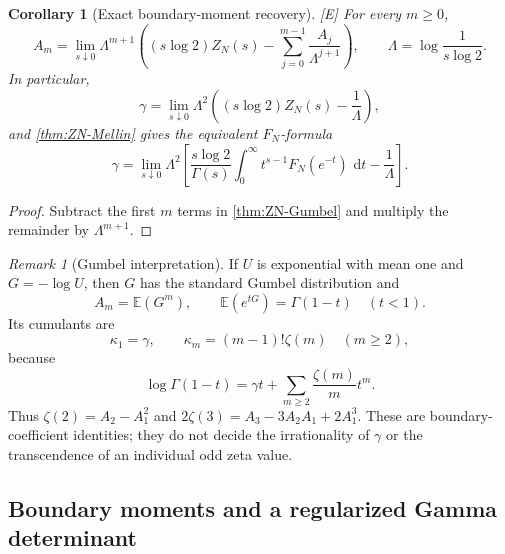 \documentclass[11pt]{article}
\newtheorem{corollary}[theorem]{Corollary}
\theoremstyle{definition}
\theoremstyle{remark}
\newtheorem{remark}[theorem]{Remark}
\newcommand{\status}[1]{\textnormal{\textcolor{accent}{\footnotesize[#1]}}}
\newcommand{\dd}{\,\mathrm d}
\begin{document}
\begin{corollary}[Exact boundary-moment recovery]
\label{cor:ZN-moment-recovery}
\status{E}
For every $m\ge0$,
\begin{equation}\label{eq:ZN-moment-recovery}
 A_m=\lim_{s\downarrow0}\Lambda^{m+1}
 \left((s\log2)Z_N(s)-\sum_{j=0}^{m-1}\frac{A_j}{\Lambda^{j+1}}\right),
 \qquad \Lambda=\log\frac1{s\log2}.
\end{equation}
In particular,
\begin{equation}\label{eq:ZN-gamma-recovery}
 \gamma=\lim_{s\downarrow0}\Lambda^2
 \left((s\log2)Z_N(s)-\frac1\Lambda\right),
\end{equation}
and \cref{thm:ZN-Mellin} gives the equivalent $F_N$-formula
\begin{equation}\label{eq:FN-gamma-recovery}
 \gamma=\lim_{s\downarrow0}\Lambda^2\left[
 \frac{s\log2}{\Gamma(s)}\int_0^\infty t^{s-1}F_N(e^{-t})\,\dd t
 -\frac1\Lambda\right].
\end{equation}
\end{corollary}

\begin{proof}
Subtract the first $m$ terms in \cref{thm:ZN-Gumbel} and multiply the remainder by
$\Lambda^{m+1}$.
\end{proof}

\begin{remark}[Gumbel interpretation]\label{rem:Gumbel-interpretation}
If $U$ is exponential with mean one and $G=-\log U$, then $G$ has the standard
Gumbel distribution and
\[
 A_m=\mathbb E(G^m),\qquad
 \mathbb E(e^{tG})=\Gamma(1-t)\quad(t<1).
\]
Its cumulants are
\begin{equation}\label{eq:Gumbel-cumulants}
 \kappa_1=\gamma,
 \qquad \kappa_m=(m-1)!\zeta(m)\quad(m\ge2),
\end{equation}
because
\begin{equation}\label{eq:log-Gamma-cumulants}
 \log\Gamma(1-t)=\gamma t+\sum_{m\ge2}\frac{\zeta(m)}{m}t^m.
\end{equation}
Thus $\zeta(2)=A_2-A_1^2$ and
$2\zeta(3)=A_3-3A_2A_1+2A_1^3$.  These are boundary-coefficient
identities; they do not decide the irrationality of $\gamma$ or the transcendence of an
individual odd zeta value.
\end{remark}

\subsection{Boundary moments and a regularized Gamma determinant}
\end{document}
